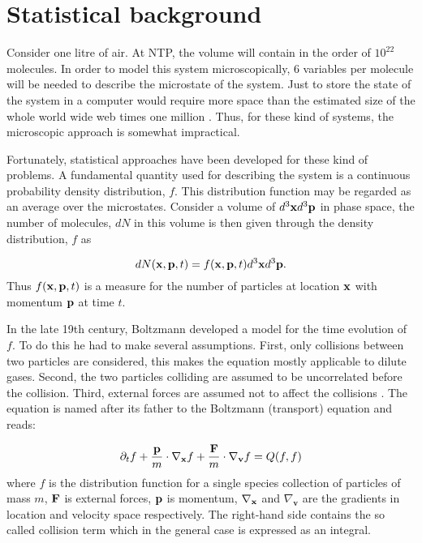 \section{Statistical background}\label{sec:lbm:stat}
Consider one litre of air. At NTP, the volume will contain in the
order of $10^{22}$ molecules. In order to model this system
microscopically, 6 variables per molecule will be needed to describe
the microstate of the system. Just to store the state of the system in
a computer would require more space than the estimated size of the
whole world wide web times one million \cite{wolfram-alpha-web}. Thus,
for these kind of systems, the microscopic approach is somewhat
impractical.

Fortunately, statistical approaches have been developed for these kind
of problems. A fundamental quantity used for describing the system is
a continuous probability density distribution, $f$. This distribution
function may be regarded as an average over the microstates. Consider a
volume of $d^3\mathbf{x} d^3\mathbf{p}$ in phase space, the number of
molecules, $dN$ in this volume is then given through the density
distribution, $f$ as

\begin{equation}
dN(\mathbf{x}, \mathbf{p}, t) = f(\mathbf{x}, \mathbf{p}, t)d^3\mathbf{x} d^3\mathbf{p}.
\end{equation}
Thus $f(\mathbf{x}, \mathbf{p}, t)$ is a measure for the number of particles at
location $\mathbf{x}$ with momentum $\mathbf{p}$ at time $t$. 

In the late 19th century, Boltzmann developed a model for the time
evolution of $f$. To do this he had to make several
assumptions. First, only collisions between two particles are
considered, this makes the equation mostly applicable to dilute
gases. Second, the two particles colliding are assumed to be
uncorrelated before the collision. Third, external forces are assumed
not to affect the collisions \cite{wolf-gladrow}. The equation is
named after its father to the Boltzmann (transport) equation and
reads:

\begin{equation}\label{eq:lbm:boltzmann-eq}
\partial_t f + \frac{\mathbf{p}}{m} \cdot \nabla_{\mathbf{x}}f + \frac{\mathbf{F}}{m} \cdot
\nabla_{\mathbf{v}}f = Q(f, f)
\end{equation}
where $f$ is the distribution function for a single species collection
of particles of mass $m$, $\mathbf{F}$ is external forces, $\mathbf{p}$ is momentum,
$\nabla_{\mathbf{x}}$ and $\nabla_{\mathbf{v}}$ are the gradients in location and
velocity space respectively. The right-hand side contains the so
called collision term which in the general case is expressed as an
integral. 

